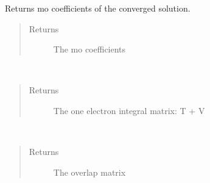 \documentclass[letterpaper,10pt,english]{sphinxmanual}
\begin{document}
\begin{fulllineitems}

\begin{fulllineitems}
\label{\detokenize{RHF:hf.HartreeFock.RHF.MF.get_mo_coeff}}
Returns mo coefficients of the converged solution.
\begin{quote}\begin{description}
\item[{Returns}] \leavevmode
The mo coefficients

\end{description}\end{quote}

\end{fulllineitems}


\begin{fulllineitems}
\label{\detokenize{RHF:hf.HartreeFock.RHF.MF.get_one_e}}~\begin{quote}\begin{description}
\item[{Returns}] \leavevmode
The one electron integral matrix: T + V

\end{description}\end{quote}

\end{fulllineitems}


\begin{fulllineitems}
\label{\detokenize{RHF:hf.HartreeFock.RHF.MF.get_ovlp}}~\begin{quote}\begin{description}
\item[{Returns}] \leavevmode
The overlap matrix

\end{description}\end{quote}

\end{fulllineitems}


\end{fulllineitems}
\end{document}
